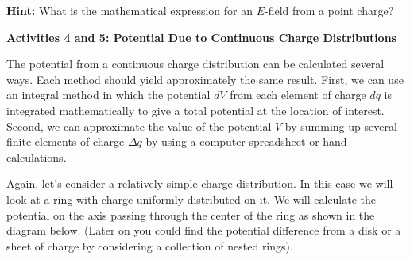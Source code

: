 \vspace{0.3cm}
{\centering {} \par}
\vspace{0.3cm}

\textbf{Hint:} What is the mathematical expression for an $E$-field
from a point charge?
\answerspace{30mm}

\textbf{Activities 4 and 5: Potential Due to Continuous Charge Distributions}

The potential from a continuous charge distribution can be calculated
several ways. Each method should yield approximately the same result.
First, we can use an integral method in which the potential $dV$ from
each element of charge $dq$ is integrated mathematically to give a total
potential at the location of interest. Second, we can approximate
the value of the potential $V$ by summing up several finite elements
of charge \( \Delta q \) by using a computer spreadsheet or hand
calculations.

Again, let's consider a relatively simple charge distribution. In
this case we will look at a ring with charge uniformly distributed
on it. We will calculate the potential on the axis passing through
the center of the ring as shown in the diagram below. (Later on you
could find the potential difference from a disk or a sheet of charge
by considering a collection of nested rings).

